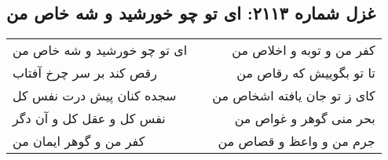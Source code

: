 \begin{center}
\section*{غزل شماره ۲۱۱۳: ای تو چو خورشید و شه خاص من}
\label{sec:2113}
\begin{longtable}{l p{0.5cm} r}
ای تو چو خورشید و شه خاص من
&&
کفر من و توبه و اخلاص من
\\
رقص کند بر سر چرخ آفتاب
&&
تا تو بگوییش که رقاص من
\\
سجده کنان پیش درت نفس کل
&&
کای ز تو جان یافته اشخاص من
\\
نفس کل و عقل کل و آن دگر
&&
بحر منی گوهر و غواص من
\\
کفر من و گوهر ایمان من
&&
جرم من و واعظ و قصاص من
\\
\end{longtable}
\end{center}
